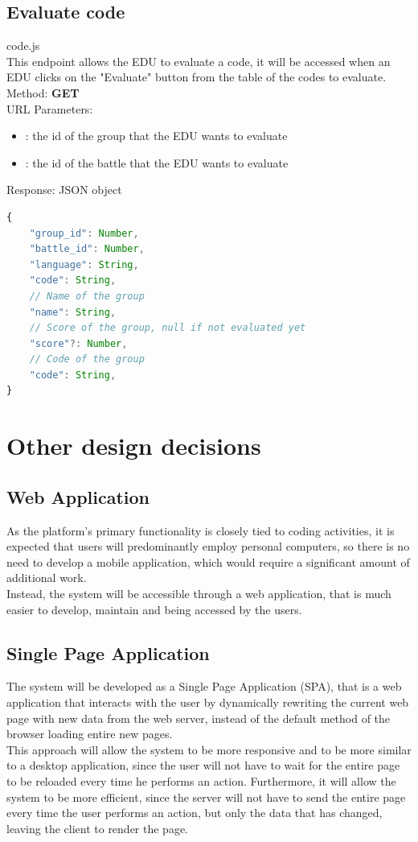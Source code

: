 \subsection{Evaluate code}
code.js\\
This endpoint allows the EDU to evaluate a code, it will be accessed when an EDU clicks on the "Evaluate" button from the table of the codes to evaluate.\\

Method: \textbf{GET}\\
URL Parameters:
\begin{itemize}
    \item {}: the id of the group that the EDU wants to evaluate
    \item {}: the id of the battle that the EDU wants to evaluate
\end{itemize}
Response: JSON object
\begin{lstlisting}[language=JavaScript, label={lst:jscode}, basicstyle=\ttfamily]
{
    "group_id": Number,
    "battle_id": Number,
    "language": String,
    "code": String,
    // Name of the group
    "name": String,
    // Score of the group, null if not evaluated yet
    "score"?: Number,
    // Code of the group
    "code": String,
}
\end{lstlisting}



\section{Other design decisions}
\subsection{Web Application}
As the platform's primary functionality is closely tied to coding activities, it is expected that users will predominantly employ personal computers, so there is no need to develop a mobile application, which would require a significant amount of additional work.\\
Instead, the system will be accessible through a web application, that is much easier to develop, maintain and being accessed by the users.

\subsection{Single Page Application}
The system will be developed as a Single Page Application (SPA), that is a web application that interacts with the user by dynamically rewriting the current web page with new data from the web server, instead of the default method of the browser loading entire new pages.\\
This approach will allow the system to be more responsive and to be more similar to a desktop application, since the user will not have to wait for the entire page to be reloaded every time he performs an action. Furthermore, it will allow the system to be more efficient, since the server will not have to send the entire page every time the user performs an action, but only the data that has changed, leaving the client to render the page.

